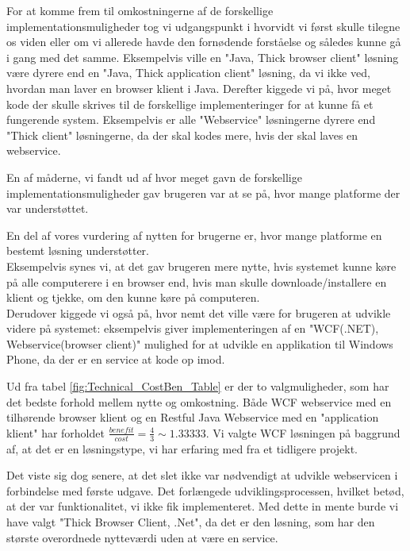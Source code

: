 For at komme frem til omkostningerne af de forskellige implementationsmuligheder tog vi udgangspunkt i hvorvidt vi først skulle tilegne os viden eller om vi allerede havde den fornødende forståelse og således kunne gå i gang med det samme. Eksempelvis ville en "Java, Thick browser client" løsning være dyrere end en "Java, Thick application client" løsning, da vi ikke ved, hvordan man laver en browser klient i Java. Derefter kiggede vi på, hvor meget kode der skulle skrives til de forskellige implementeringer for at kunne få et fungerende system. Eksempelvis er alle "Webservice" løsningerne dyrere end "Thick client" løsningerne, da der skal kodes mere, hvis der skal laves en webservice.

En af måderne, vi fandt ud af hvor meget gavn de forskellige implementationsmuligheder gav brugeren var at se på, hvor mange platforme der var understøttet.

En del af vores vurdering af nytten for brugerne er, hvor mange platforme en bestemt løsning understøtter.
\\Eksempelvis synes vi, at det gav brugeren mere nytte, hvis systemet kunne køre på alle computerere i en browser end, hvis man skulle downloade/installere en klient og tjekke, om den kunne køre på computeren.
\\Derudover kiggede vi også på, hvor nemt det ville være for brugeren at udvikle videre på systemet: eksempelvis giver implementeringen af en "WCF(.NET), Webservice(browser client)" mulighed for at udvikle en applikation til Windows Phone, da der er en service at kode op imod.

Ud fra tabel \ref{fig:Technical_CostBen_Table} er der to valgmuligheder, som har det bedste forhold mellem nytte og omkostning. Både WCF webservice med en tilhørende browser klient og en Restful Java Webservice med en "application klient" har forholdet \begin{math}\frac{benefit}{cost} = \frac{4}{3} \sim 1.33333\end{math}. Vi valgte WCF løsningen på baggrund af, at det er en løsningstype, vi har erfaring med fra et tidligere projekt. 

Det viste sig dog senere, at det slet ikke var nødvendigt at udvikle webservicen i forbindelse med første udgave. Det forlængede udviklingsprocessen, hvilket betød, at der var funktionalitet, vi ikke fik implementeret. Med dette in mente burde vi have valgt "Thick Browser Client, .Net", da det er den løsning, som har den største overordnede nytteværdi uden at være en service.